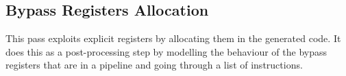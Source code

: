 \subsection{Bypass Registers Allocation}
This pass exploits explicit registers by allocating them in the generated code. It does this as a post-processing step by modelling the behaviour of the bypass registers that are in a pipeline and going through a list of instructions. %










